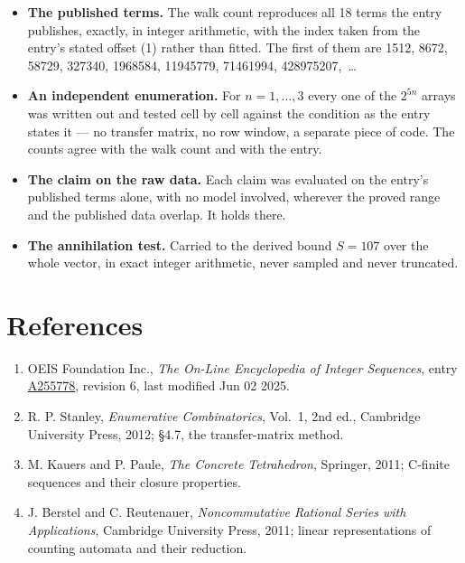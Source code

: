 \documentclass[11pt]{article}
\theoremstyle{definition}
\begin{document}
\begin{itemize}

\item {\bfseries The published terms.} The walk count reproduces all 18 terms the entry publishes, exactly, in integer arithmetic, with the index taken from the entry's stated offset (1) rather than fitted. The first of them are 1512, 8672, 58729, 327340, 1968584, 11945779, 71461994, 428975207,~\dots

\item {\bfseries An independent enumeration.} For $n = 1,\dots,3$ every one of the $2^{5n}$ arrays was written out and tested cell by cell against the condition as the entry states it --- no transfer matrix, no row window, a separate piece of code. The counts agree with the walk count and with the entry.

\item {\bfseries The claim on the raw data.} Each claim was evaluated on the entry's published terms alone, with no model involved, wherever the proved range and the published data overlap. It holds there.

\item {\bfseries The annihilation test.} Carried to the derived bound $S = 107$ over the whole vector, in exact integer arithmetic, never sampled and never truncated.

\end{itemize}

\section{References}

\begin{enumerate}

\item OEIS Foundation Inc., \emph{The On-Line Encyclopedia of Integer Sequences}, entry \href{https://oeis.org/A255778}{A255778}, revision 6, last modified Jun 02 2025.

\item R. P. Stanley, \emph{Enumerative Combinatorics}, Vol.~1, 2nd ed., Cambridge University Press, 2012; \S4.7, the transfer-matrix method.

\item M. Kauers and P. Paule, \emph{The Concrete Tetrahedron}, Springer, 2011; C-finite sequences and their closure properties.

\item J. Berstel and C. Reutenauer, \emph{Noncommutative Rational Series with Applications}, Cambridge University Press, 2011; linear representations of counting automata and their reduction.

\end{enumerate}
\end{document}
